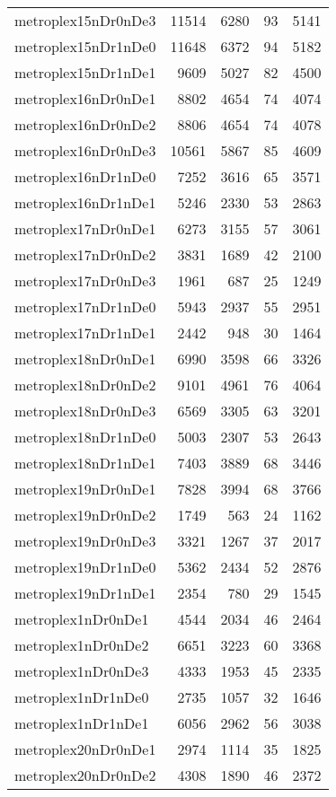 \begin{longtable}{lrrrr}
metroplex15nDr0nDe3 & 11514 & 6280 & 93 & 5141 \\
metroplex15nDr1nDe0 & 11648 & 6372 & 94 & 5182 \\
metroplex15nDr1nDe1 & 9609 & 5027 & 82 & 4500 \\
metroplex16nDr0nDe1 & 8802 & 4654 & 74 & 4074 \\
metroplex16nDr0nDe2 & 8806 & 4654 & 74 & 4078 \\
metroplex16nDr0nDe3 & 10561 & 5867 & 85 & 4609 \\
metroplex16nDr1nDe0 & 7252 & 3616 & 65 & 3571 \\
metroplex16nDr1nDe1 & 5246 & 2330 & 53 & 2863 \\
metroplex17nDr0nDe1 & 6273 & 3155 & 57 & 3061 \\
metroplex17nDr0nDe2 & 3831 & 1689 & 42 & 2100 \\
metroplex17nDr0nDe3 & 1961 & 687 & 25 & 1249 \\
metroplex17nDr1nDe0 & 5943 & 2937 & 55 & 2951 \\
metroplex17nDr1nDe1 & 2442 & 948 & 30 & 1464 \\
metroplex18nDr0nDe1 & 6990 & 3598 & 66 & 3326 \\
metroplex18nDr0nDe2 & 9101 & 4961 & 76 & 4064 \\
metroplex18nDr0nDe3 & 6569 & 3305 & 63 & 3201 \\
metroplex18nDr1nDe0 & 5003 & 2307 & 53 & 2643 \\
metroplex18nDr1nDe1 & 7403 & 3889 & 68 & 3446 \\
metroplex19nDr0nDe1 & 7828 & 3994 & 68 & 3766 \\
metroplex19nDr0nDe2 & 1749 & 563 & 24 & 1162 \\
metroplex19nDr0nDe3 & 3321 & 1267 & 37 & 2017 \\
metroplex19nDr1nDe0 & 5362 & 2434 & 52 & 2876 \\
metroplex19nDr1nDe1 & 2354 & 780 & 29 & 1545 \\
metroplex1nDr0nDe1 & 4544 & 2034 & 46 & 2464 \\
metroplex1nDr0nDe2 & 6651 & 3223 & 60 & 3368 \\
metroplex1nDr0nDe3 & 4333 & 1953 & 45 & 2335 \\
metroplex1nDr1nDe0 & 2735 & 1057 & 32 & 1646 \\
metroplex1nDr1nDe1 & 6056 & 2962 & 56 & 3038 \\
metroplex20nDr0nDe1 & 2974 & 1114 & 35 & 1825 \\
metroplex20nDr0nDe2 & 4308 & 1890 & 46 & 2372 \\

\end{longtable}
